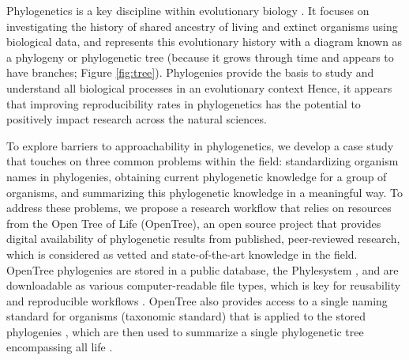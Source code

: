\documentclass[12pt]{article}
\begin{document}
Phylogenetics is a key discipline within evolutionary biology \citep{dobzhansky1973nothing}.
It focuses on investigating the history of shared ancestry of living and extinct
organisms using biological data,
and represents this evolutionary history with a diagram known as a phylogeny
or phylogenetic tree (because it grows through time and appears to have branches;
Figure \ref{fig:tree}).
Phylogenies provide the basis to study and understand all biological processes
in an evolutionary context \citep{dobzhansky1973nothing}
Hence, it appears that improving reproducibility rates in phylogenetics has the
potential to positively impact research across the natural sciences.

To explore barriers to approachability in phylogenetics, we develop a case study
that touches on three common problems within the field: standardizing
organism names in phylogenies, obtaining current phylogenetic knowledge for a group of organisms,
and summarizing this phylogenetic knowledge in a meaningful way.
To address these problems, we propose a research workflow that relies on resources from the Open
Tree of Life (OpenTree), an open source project that provides
digital availability of phylogenetic results from published, peer-reviewed research, which
is considered as vetted and state-of-the-art knowledge in the field.
OpenTree phylogenies are stored in a public database, the Phylesystem \citep{mctavish2015phylesystem},
and are downloadable as various computer-readable file types, which is key for reusability
and reproducible workflows \citep{wilson2017good}.
OpenTree also provides access to a single naming standard for organisms (taxonomic standard)
that is applied to the stored phylogenies \citep{rees2017automated}, which are
then used to summarize a single phylogenetic tree encompassing all life \citep{opentreeoflife2019synth}.
\end{document}
